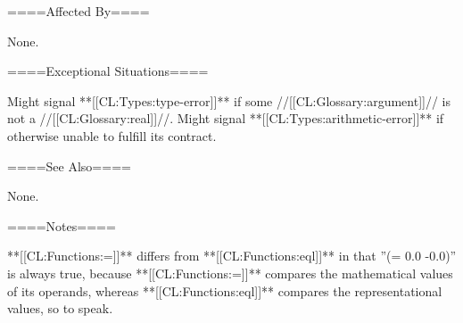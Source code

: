 ====Affected By====

None.

====Exceptional Situations====

Might signal **[[CL:Types:type-error]]** if some //[[CL:Glossary:argument]]// is not a //[[CL:Glossary:real]]//. Might signal **[[CL:Types:arithmetic-error]]** if otherwise unable to fulfill its contract.

====See Also====

None.

====Notes====

**[[CL:Functions:=]]** differs from **[[CL:Functions:eql]]** in that ''(= 0.0 -0.0)'' is always true, because **[[CL:Functions:=]]** compares the mathematical values of its operands, whereas **[[CL:Functions:eql]]** compares the representational values, so to speak.


